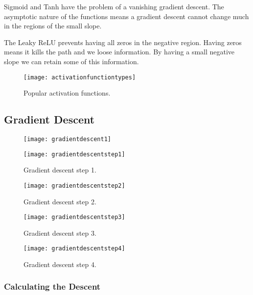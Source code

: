 Sigmoid and Tanh have the problem of a vanishing gradient descent.  The asymptotic nature of the functions means a gradient descent cannot change much in the regions of the small slope.

The Leaky ReLU prevents having all zeros in the negative region.  Having zeros means it kills the path and we loose information.  By having a small negative slope we can retain some of this information.

 	\begin{figure}[h]
		\centering
		\texttt{[image: activationfunctiontypes]}
		\caption{Popular activation functions.}
		\label{fig:activationfunctiontypes}
	\end{figure}

	\subsection{Gradient Descent}

 	\begin{figure}[h]
		\centering
		\texttt{[image: gradientdescent1]}
		\caption{}
		\label{fig:gradientdescent1}
	\end{figure}


 	\begin{figure}[h]
		\centering
		\texttt{[image: gradientdescentstep1]}
		\caption{Gradient descent step 1.}
		\label{fig:gradientdescentstep1}
	\end{figure}

 	\begin{figure}[h]
		\centering
		\texttt{[image: gradientdescentstep2]}
		\caption{Gradient descent step 2.}
		\label{fig:gradientdescentstep2}
	\end{figure}

 	\begin{figure}[h]
		\centering
		\texttt{[image: gradientdescentstep3]}
		\caption{Gradient descent step 3.}
		\label{fig:gradientdescentstep3}
	\end{figure}

 	\begin{figure}[h]
		\centering
		\texttt{[image: gradientdescentstep4]}
		\caption{Gradient descent step 4.}
		\label{fig:gradientdescentstep4}
	\end{figure}

	\subsubsection{Calculating the Descent}

